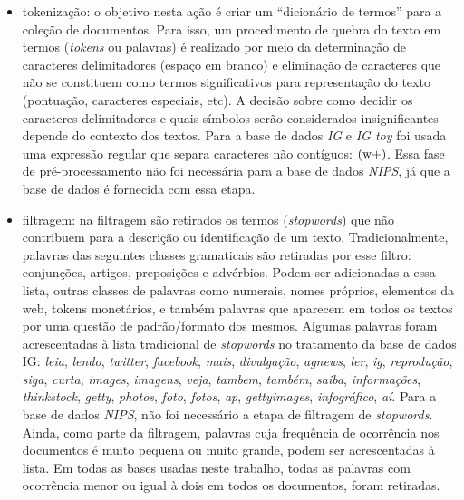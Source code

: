 \documentclass[
    12pt,                %
    oneside,            %
    a4paper,            %
    english,            %
    brazil                %
    ]{abntex2ppgsi}
\begin{document}
\begin{itemize}
    \item tokenização: o objetivo nesta ação é criar um ``dicionário de termos'' para a coleção de documentos. Para isso, um procedimento de quebra do texto em termos (\textit{tokens} ou palavras) é realizado por meio da determinação de caracteres delimitadores (espaço em branco) e eliminação de caracteres que não se constituem como termos significativos para representação do texto (pontuação, caracteres especiais, etc). A decisão sobre como decidir os caracteres delimitadores e quais símbolos serão considerados insignificantes depende do contexto dos textos. Para a base de dados \textit{IG} e \textit{IG toy} foi usada uma expressão regular que separa caracteres não contíguos: $\text{(\\w+)}$. Essa fase de pré-processamento não foi necessária para a base de dados \textit{NIPS}, já que a base de dados é fornecida com essa etapa.
    \item filtragem: na filtragem são retirados os termos (\textit{stopwords}) que não contribuem para a descrição ou identificação de um texto. Tradicionalmente, palavras das seguintes classes gramaticais são retiradas por esse filtro: conjunções, artigos, preposições e advérbios. Podem ser adicionadas a essa lista, outras classes de palavras como numerais, nomes próprios, elementos da web, tokens monetários, e também palavras que aparecem em todos os textos por uma questão de padrão/formato dos mesmos. Algumas palavras foram acrescentadas à lista tradicional de \textit{stopwords} no tratamento da base de dados IG: \textit{leia}, \textit{lendo}, \textit{twitter}, \textit{facebook}, \textit{mais}, \textit{divulgação}, \textit{agnews}, \textit{ler}, \textit{ig}, \textit{reprodução}, \textit{siga}, \textit{curta}, \textit{images}, \textit{imagens}, \textit{veja}, \textit{tambem}, \textit{também}, \textit{saiba}, \textit{informações}, \textit{thinkstock}, \textit{getty}, \textit{photos}, \textit{foto}, \textit{fotos}, \textit{ap}, \textit{gettyimages}, \textit{infográfico}, \textit{aí}. Para a base de dados \textit{NIPS}, não foi necessário a etapa de filtragem de \textit{stopwords}. Ainda, como parte da filtragem, palavras cuja frequência de ocorrência nos documentos é muito pequena ou muito grande, podem ser acrescentadas à lista. Em todas as bases usadas neste trabalho, todas as palavras com ocorrência menor ou igual à dois em todos os documentos, foram retiradas.
\end{itemize}
\end{document}
